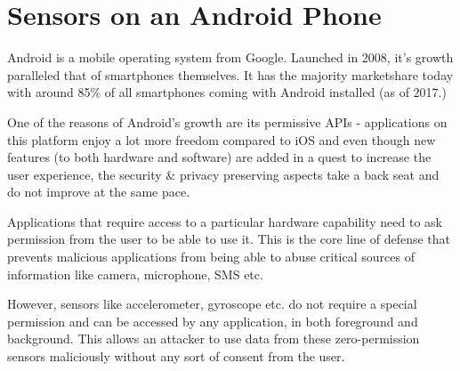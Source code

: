 \section{Sensors on an Android Phone}
\label{ch1-intro-android}

Android is a mobile operating system from Google. Launched in 2008, it's growth paralleled that of smartphones themselves. It has the majority marketshare today with around 85\% of all smartphones coming with Android installed (as of 2017.) \cite{androidshare}

One of the reasons of Android's growth are its permissive APIs - applications on this platform enjoy a lot more freedom compared to iOS and even though new features (to both hardware and software) are added in a quest to increase the user experience, the security \& privacy preserving aspects take a back seat and do not improve at the same pace.

Applications that require access to a particular hardware capability need to ask permission from the user to be able to use it. This is the core line of defense that prevents malicious applications from being able to abuse critical sources of information like camera, microphone, SMS etc.

However, sensors like accelerometer, gyroscope etc. do not require a special permission and can be accessed by any application, in both foreground and background. This allows an attacker to use data from these zero-permission sensors maliciously without any sort of consent from the user.








